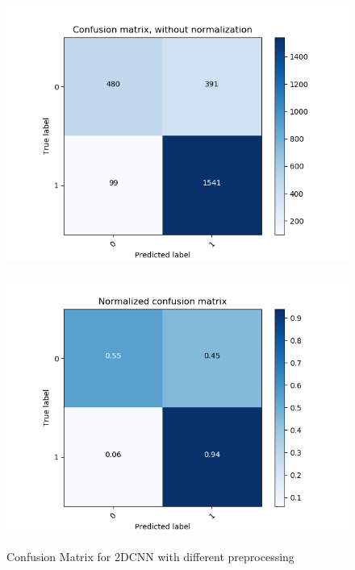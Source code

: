 \begin{figure}[H]
\begin{minipage}[b]{0.45\columnwidth}
		\includegraphics[clip, width=\linewidth]{fig/chapter4/3d/confusion_matrix/count_confusion_matrix_False_100_gru}
		\label{fig: count_pretrain_preprocess}
	\end{minipage}
	\begin{minipage}[b]{0.45\columnwidth}
		\centering
		\includegraphics[clip, width=\linewidth]{fig/chapter4/3d/confusion_matrix/normalized_confusion_matrix_False_100_gru}
		\label{fig: pretrain_preprocess}
	\end{minipage}
	
	
	\caption{Confusion Matrix for 2DCNN with different preprocessing}
	\label{fig:gru_matrix}
	
\end{figure}

